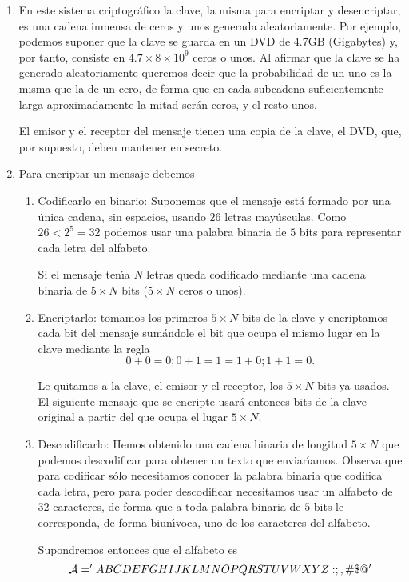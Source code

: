  \begin{enumerate}
 
\item  En este sistema criptogr\'afico {\sc la clave}, la misma para encriptar y
desencriptar, es una cadena inmensa de ceros y unos generada aleatoriamente. Por
ejemplo, podemos suponer que la clave se guarda en un DVD de 4.7GB (Gigabytes)
y, por tanto, consiste en $4.7\times 8\times 10^9$ ceros o unos. Al afirmar que 
la clave
se ha generado aleatoriamente queremos decir que la probabilidad de un uno es la
misma que la de un cero, de forma que en cada subcadena suficientemente larga
aproximadamente la mitad ser\'an ceros, y el resto unos. 


El emisor y el receptor del mensaje tienen una copia de la clave, el DVD, que,
por supuesto, deben mantener en secreto. 

\item Para encriptar un mensaje debemos
\begin{enumerate}
 \item {\sc Codificarlo en binario:} Suponemos que el mensaje est\'a formado por
una \'unica cadena, sin espacios, usando $26$ letras may\'usculas. Como
$26<2^5=32$ podemos usar una palabra binaria de $5$ bits para representar cada
letra del alfabeto.

Si el mensaje ten\'{\i}a $N$ letras queda codificado mediante una cadena
binaria de $5\times  N$ bits ($5\times  N$ ceros o unos).

\item {\sc Encriptarlo:}  tomamos los primeros
$5\times N$ bits de la clave y encriptamos cada bit del mensaje sum\'andole el
bit que ocupa el mismo lugar en la clave mediante la regla
\[0+0=0;0+1=1=1+0;1+1=0.\]

{\sc Le quitamos a la clave}, el emisor y el receptor,  los $5\times  N$ bits ya
usados. El siguiente mensaje que se encripte usar\'a entonces bits de la clave
original a partir del que ocupa el lugar $5\times  N$.

\item {\sc Descodificarlo:} Hemos obtenido  una cadena binaria de longitud
$5\times  N$ que podemos descodificar para obtener un texto  que
enviar\'{\i}amos. Observa que para
codificar s\'olo necesitamos conocer la palabra binaria que codifica cada letra,
pero para poder descodificar necesitamos usar un alfabeto de $32$
caracteres, de forma que a toda palabra binaria de $5$ bits le corresponda, de
forma biun\'{\i}voca,  uno de los caracteres del alfabeto.  

Supondremos entonces que el alfabeto es 
\[\mathcal{A}='ABCDEFGHIJKLMNOPQRSTUVWXYZ:;,\#\$\\@'\]

\end{enumerate}
\end{enumerate}
 
